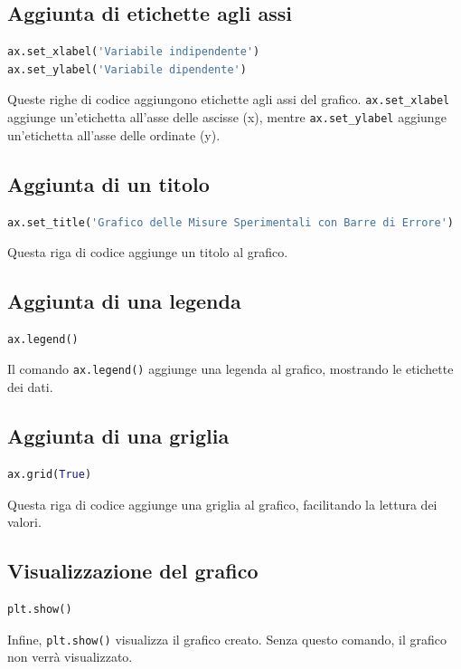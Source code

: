 \documentclass[a4paper,12pt]{article}
\begin{document}
\subsection{Aggiunta di etichette agli assi}
\begin{lstlisting}[language=Python, caption=Aggiunta di etichette agli assi]
ax.set_xlabel('Variabile indipendente')
ax.set_ylabel('Variabile dipendente')
\end{lstlisting}
Queste righe di codice aggiungono etichette agli assi del grafico. \texttt{ax.set\_xlabel} aggiunge un'etichetta all'asse delle ascisse (x), mentre \texttt{ax.set\_ylabel} aggiunge un'etichetta all'asse delle ordinate (y).

\subsection{Aggiunta di un titolo}
\begin{lstlisting}[language=Python, caption=Aggiunta di un titolo]
ax.set_title('Grafico delle Misure Sperimentali con Barre di Errore')
\end{lstlisting}
Questa riga di codice aggiunge un titolo al grafico.

\subsection{Aggiunta di una legenda}
\begin{lstlisting}[language=Python, caption=Aggiunta di una legenda]
ax.legend()
\end{lstlisting}
Il comando \texttt{ax.legend()} aggiunge una legenda al grafico, mostrando le etichette dei dati.

\subsection{Aggiunta di una griglia}
\begin{lstlisting}[language=Python, caption=Aggiunta di una griglia]
ax.grid(True)
\end{lstlisting}
Questa riga di codice aggiunge una griglia al grafico, facilitando la lettura dei valori.

\subsection{Visualizzazione del grafico}
\begin{lstlisting}[language=Python, caption=Visualizzazione del grafico]
plt.show()
\end{lstlisting}
Infine, \texttt{plt.show()} visualizza il grafico creato. Senza questo comando, il grafico non verrà visualizzato.
\end{document}
